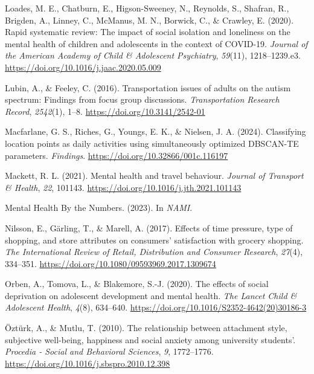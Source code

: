 \documentclass[
  letterpaper,
  number,
  review,
  3p]{elsarticle}
\newlength{\cslhangindent}
\newenvironment{CSLReferences}[2] %
 {\begin{list}{}{%
  \setlength{\itemindent}{0pt}
  \setlength{\leftmargin}{0pt}
  \setlength{\parsep}{0pt}
  \ifodd #1
   \setlength{\leftmargin}{\cslhangindent}
   \setlength{\itemindent}{-1\cslhangindent}
  \fi
  \setlength{\itemsep}{#2\baselineskip}}}
 {\end{list}}
\begin{document}
\begin{CSLReferences}{1}{0}
Loades, M. E., Chatburn, E., Higson-Sweeney, N., Reynolds, S., Shafran,
R., Brigden, A., Linney, C., McManus, M. N., Borwick, C., \& Crawley, E.
(2020). Rapid systematic review: {The} impact of social isolation and
loneliness on the mental health of children and adolescents in the
context of {COVID-19}. \emph{Journal of the American Academy of Child \&
Adolescent Psychiatry}, \emph{59}(11), 1218--1239.e3.
\url{https://doi.org/10.1016/j.jaac.2020.05.009}

Lubin, A., \& Feeley, C. (2016). Transportation issues of adults on the
autism spectrum: {Findings} from focus group discussions.
\emph{Transportation Research Record}, \emph{2542}(1), 1--8.
\url{https://doi.org/10.3141/2542-01}

Macfarlane, G. S., Riches, G., Youngs, E. K., \& Nielsen, J. A. (2024).
Classifying location points as daily activities using simultaneously
optimized {DBSCAN-TE} parameters. \emph{Findings}.
\url{https://doi.org/10.32866/001c.116197}

Mackett, R. L. (2021). Mental health and travel behaviour. \emph{Journal
of Transport \& Health}, \emph{22}, 101143.
\url{https://doi.org/10.1016/j.jth.2021.101143}

Mental {Health By} the {Numbers}. (2023). In \emph{NAMI}.

Nilsson, E., Gärling, T., \& Marell, A. (2017). Effects of time
pressure, type of shopping, and store attributes on consumers'
satisfaction with grocery shopping. \emph{The International Review of
Retail, Distribution and Consumer Research}, \emph{27}(4), 334--351.
\url{https://doi.org/10.1080/09593969.2017.1309674}

Orben, A., Tomova, L., \& Blakemore, S.-J. (2020). The effects of social
deprivation on adolescent development and mental health. \emph{The
Lancet Child \& Adolescent Health}, \emph{4}(8), 634--640.
\url{https://doi.org/10.1016/S2352-4642(20)30186-3}

Öztürk, A., \& Mutlu, T. (2010). The relationship between attachment
style, subjective well-being, happiness and social anxiety among
university students'. \emph{Procedia - Social and Behavioral Sciences},
\emph{9}, 1772--1776. \url{https://doi.org/10.1016/j.sbspro.2010.12.398}


\end{CSLReferences}
\end{document}
